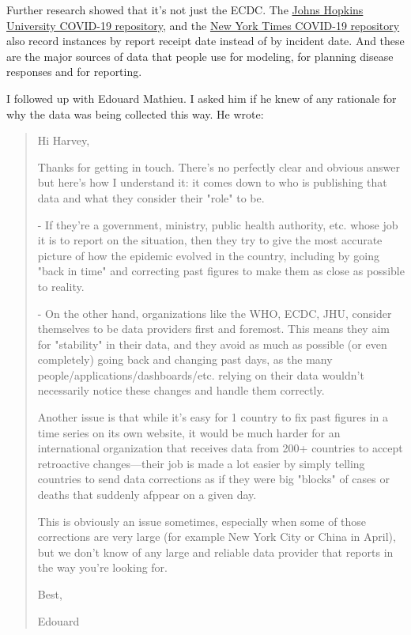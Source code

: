 \documentclass[10pt,reqno]{amsart}
\begin{document}
Further research showed that it's not just the ECDC.  The
\href{https://github.com/CSSEGISandData/COVID-19}{Johns Hopkins
  University COVID-19 repository}, and the
\href{https://github.com/nytimes/covid-19-data}{New York Times
  COVID-19 repository} also record instances by report receipt date
instead of by incident date.  And these are the major sources of data
that people use for modeling, for planning disease responses and for
reporting.

I followed up with Edouard Mathieu.  I asked him if he knew of any
rationale for why the data was being collected this way.  He wrote:

\begin{quotation}
  Hi Harvey,

Thanks for getting in touch. There's no perfectly clear and obvious
answer but here's how I understand it: it comes down to who is
publishing that data and what they consider their "role" to be.

- If they're a government, ministry, public health authority,
etc. whose job it is to report on the situation, then they try to give
the most accurate picture of how the epidemic evolved in the country,
including by going "back in time" and correcting past figures to make
them as close as possible to reality.

- On the other hand, organizations like the WHO, ECDC, JHU, consider
themselves to be data providers first and foremost. This means they
aim for "stability" in their data, and they avoid as much as possible
(or even completely) going back and changing past days, as the many
people/applications/dashboards/etc. relying on their data wouldn't
necessarily notice these changes and handle them correctly. 

Another issue is that while it's easy for 1 country to fix past
figures in a time series on its own website, it would be much harder
for an international organization that receives data from 200+
countries to accept retroactive changes—their job is made a lot easier
by simply telling countries to send data corrections as if they were
big "blocks" of cases or deaths that suddenly afppear on a given day.

This is obviously an issue sometimes, especially when some of those
corrections are very large (for example New York City or China in
April), but we don't know of any large and reliable data provider that
reports in the way you're looking for.

Best,

Edouard
\end{quotation}
\end{document}
